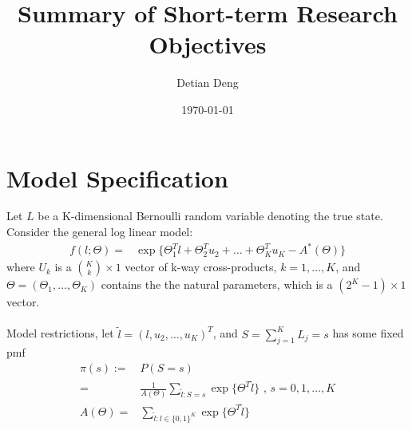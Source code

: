 \documentclass[11 pt, a4paper]{article}  %
\begin{document}
\title{Summary of Short-term Research Objectives}   %
\author{Detian Deng}         %
\date{\today}    %
\maketitle


\section{Model Specification}             %
Let $L$ be a K-dimensional Bernoulli random variable denoting the true state.
Consider the general log linear model:
\begin{align*}
f(l; \Theta) = & \exp \{\Theta_1^T l + \Theta_2^{T} u_2 + \ldots + \Theta_K^T u_K - A^*(\Theta)\}
\end{align*}
where $U_k$ is a ${K \choose k} \times 1$ vector of k-way cross-products, $k = 1,\ldots,K$,  and $\Theta = (\Theta_1,\ldots, \Theta_K)$ contains the the natural parameters, which is a $(2^K-1) \times 1$ vector.\\
\ \\
Model restrictions, let $\tilde{l} = (l,u_2,\dots,u_K)^T$, and $S = \sum_{j=1}^K L_j = s$ has some fixed pmf 
\begin{align}
\pi(s) := & P(S=s)\nonumber \\ 
= & \frac{1}{A(\Theta)} \sum_{\tilde{l}:S=s}\exp \{ \Theta^T \tilde{l}\}  \text{ , } s = 0,1,\ldots, K \\
A(\Theta) = & \sum_{\tilde{l}:l\in \{0,1\}^K}\exp \{ \Theta^T \tilde{l}\}
\end{align}


\newpage
\end{document}
